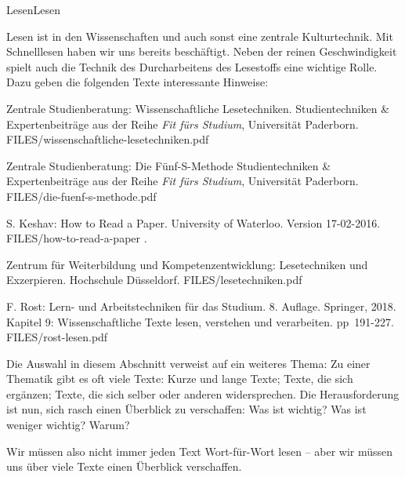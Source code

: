 

\unit{Lesen}{Lesen}

Lesen ist in den Wissenschaften und auch sonst eine zentrale Kulturtechnik. Mit Schnelllesen haben
wir uns bereits beschäftigt. Neben der reinen  Geschwindigkeit spielt auch die Technik des Durcharbeitens
des Lesestoffs eine wichtige Rolle. Dazu geben die folgenden Texte interessante Hinweise:

{Zentrale Studienberatung: Wissenschaftliche Lesetechniken.
Studientechniken \& Expertenbeiträge aus der Reihe \textit{Fit fürs Studium},
Universität Paderborn.}
{FILES/wissenschaftliche-lesetechniken.pdf}
{\href{https://groups.uni-paderborn.de/zsb-fit-fuers-studium/index.php/wissenschaftliches-lesen-recherchieren/}{\online}}


{Zentrale Studienberatung: Die Fünf-S-Methode 
Studientechniken \& Expertenbeiträge aus der Reihe \textit{Fit fürs Studium},
Universität Paderborn.}
{FILES/die-fuenf-s-methode.pdf}
{\href{https://groups.uni-paderborn.de/zsb-fit-fuers-studium/index.php/allgemein/die-fuenf-s-methode/}{\online}}

{S. Keshav: How to Read a Paper. University of Waterloo. Version 17-02-2016.}
{FILES/how-to-read-a-paper}
{\href{http://ccr.sigcomm.org/online/files/p83-keshavA.pdf}{\online}}
.


{Zentrum für Weiterbildung und Kompetenzentwicklung: Lesetechniken und Exzerpieren.
Hochschule Düsseldorf.}
{FILES/lesetechniken.pdf}
{\href{https://zwek.hs-duesseldorf.de/Documents/Downloadportal\%20Schreibberatung/AB\%20Lesetechniken_2019.pdf}{\online}}


{F. Rost: Lern- und Arbeitstechniken für das Studium.
8. Auflage.
Springer, 2018.
Kapitel 9: Wissenschaftliche Texte lesen, verstehen und verarbeiten. pp~191-227.}
{FILES/rost-lesen.pdf}
{}

Die Auswahl in diesem Abschnitt verweist auf ein weiteres Thema: Zu einer Thematik gibt es oft
viele Texte: Kurze und lange Texte; Texte, die sich ergänzen; Texte, die sich selber oder anderen
widersprechen. Die Herausforderung ist nun, sich rasch einen Überblick zu verschaffen:
Was ist wichtig? Was ist weniger wichtig? Warum?

Wir müssen also nicht immer jeden Text Wort-für-Wort lesen -- aber wir müssen uns über viele
Texte einen Überblick verschaffen.

